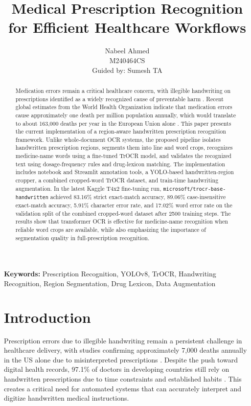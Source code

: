 \documentclass[twocolumn,10pt]{article}
\title{Medical Prescription Recognition for Efficient Healthcare Workflows}
\author{Nabeel Ahmed\\M240464CS\\Guided by: Sumesh TA}
\begin{document}
	
\maketitle
	
{\bf Keywords:}
Prescription Recognition, YOLOv8, TrOCR, Handwriting Recognition, Region Segmentation, Drug Lexicon, Data Augmentation


\begin{abstract}
Medication errors remain a critical healthcare concern, with illegible handwriting on prescriptions identified as a widely recognized cause of preventable harm \cite{statpearls2024, amcp2019}. Recent global estimates from the World Health Organization indicate that medication errors cause approximately one death per million population annually, which would translate to about 163,000 deaths per year in the European Union alone \cite{eaasm2022}.
This paper presents the current implementation of a region-aware handwritten prescription recognition framework. Unlike whole-document OCR systems, the proposed pipeline isolates handwritten prescription regions, segments them into line and word crops, recognizes medicine-name words using a fine-tuned TrOCR model, and validates the recognized text using dosage-frequency rules and drug-lexicon matching. The implementation includes notebook and Streamlit annotation tools, a YOLO-based handwritten-region cropper, a combined cropped-word TrOCR dataset, and train-time handwriting augmentation. In the latest Kaggle T4x2 fine-tuning run, \texttt{microsoft/trocr-base-handwritten} achieved 83.16\% strict exact-match accuracy, 89.06\% case-insensitive exact-match accuracy, 5.91\% character error rate, and 17.02\% word error rate on the validation split of the combined cropped-word dataset after 2500 training steps. The results show that transformer OCR is effective for medicine-name recognition when reliable word crops are available, while also emphasizing the importance of segmentation quality in full-prescription recognition.
\end{abstract}


\section{Introduction}
Prescription errors due to illegible handwriting remain a persistent challenge in healthcare delivery, with studies confirming approximately 7,000 deaths annually in the US alone due to misinterpreted prescriptions \cite{bhuiyan2022online}. Despite the push toward digital health records, 97.1\% of doctors in developing countries still rely on handwritten prescriptions due to time constraints and established habits \cite{bhuiyan2022online}. This creates a critical need for automated systems that can accurately interpret and digitize handwritten medical instructions.
\end{document}
